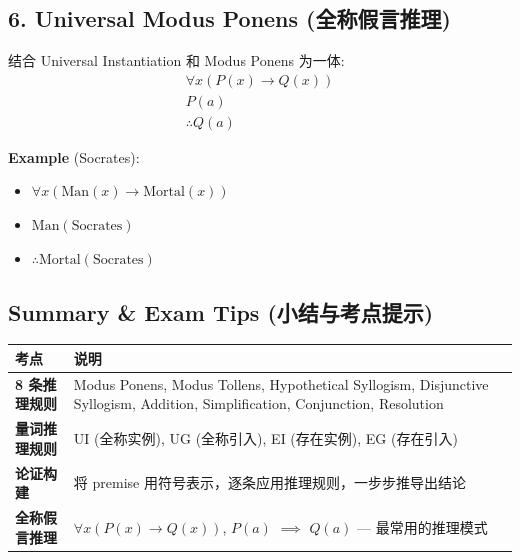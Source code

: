 \documentclass[10pt,a4paper,openany]{ctexbook}
\theoremstyle{definition}
\theoremstyle{remark}
\begin{document}
\vspace{-2pt}

\subsection{6. Universal Modus Ponens (全称假言推理)}

结合 Universal Instantiation 和 Modus Ponens 为一体:
\[
\begin{array}{c}
\forall x (P(x) \to Q(x)) \\
P(a) \\
\hline
\therefore Q(a)
\end{array}
\]

\textbf{Example} (Socrates):
\begin{itemize}
\item $\forall x (\text{Man}(x) \to \text{Mortal}(x))$
\item $\text{Man}(\text{Socrates})$
\item $\therefore \text{Mortal}(\text{Socrates})$

\end{itemize}

\vspace{-2pt}

\subsection{Summary \& Exam Tips (小结与考点提示)}

\begin{center}
\begin{tabular}{ll}
\hline
考点 & 说明 \\ \hline
\textbf{8 条推理规则} & Modus Ponens, Modus Tollens, Hypothetical Syllogism, Disjunctive Syllogism, Addition, Simplification, Conjunction, Resolution \\
\textbf{量词推理规则} & UI (全称实例), UG (全称引入), EI (存在实例), EG (存在引入) \\
\textbf{论证构建} & 将 premise 用符号表示，逐条应用推理规则，一步步推导出结论 \\
\textbf{全称假言推理} & $\forall x(P(x)\to Q(x))$, $P(a)$ $\implies$ $Q(a)$ — 最常用的推理模式 \\
\hline
\end{tabular}

\end{center}
\end{document}
